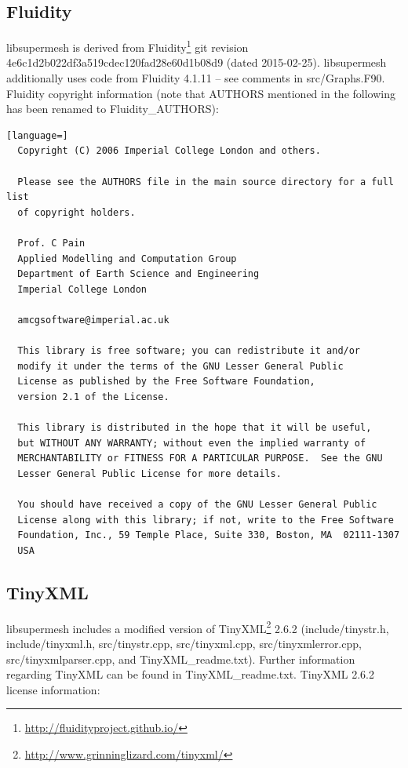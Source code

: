 \documentclass{article}
\begin{document}
\subsection{Fluidity}

libsupermesh is derived from
Fluidity\footnote{\url{http://fluidityproject.github.io/}} git revision
4e6c1d2b022df3a519cdec120fad28e60d1b08d9 (dated 2015-02-25). libsupermesh
additionally uses code from Fluidity 4.1.11 -- see comments in src/Graphs.F90.
Fluidity copyright information (note that AUTHORS mentioned in the following has
been renamed to Fluidity\_AUTHORS):

\begin{lstlisting}[language=]
  Copyright (C) 2006 Imperial College London and others.
  
  Please see the AUTHORS file in the main source directory for a full list
  of copyright holders.

  Prof. C Pain
  Applied Modelling and Computation Group
  Department of Earth Science and Engineering
  Imperial College London

  amcgsoftware@imperial.ac.uk
  
  This library is free software; you can redistribute it and/or
  modify it under the terms of the GNU Lesser General Public
  License as published by the Free Software Foundation,
  version 2.1 of the License.

  This library is distributed in the hope that it will be useful,
  but WITHOUT ANY WARRANTY; without even the implied warranty of
  MERCHANTABILITY or FITNESS FOR A PARTICULAR PURPOSE.  See the GNU
  Lesser General Public License for more details.

  You should have received a copy of the GNU Lesser General Public
  License along with this library; if not, write to the Free Software
  Foundation, Inc., 59 Temple Place, Suite 330, Boston, MA  02111-1307
  USA
\end{lstlisting}

\subsection{TinyXML}

libsupermesh includes a modified version of
TinyXML\footnote{\url{http://www.grinninglizard.com/tinyxml/}} 2.6.2
(include/tinystr.h, include/tinyxml.h, \linebreak src/tinystr.cpp,
src/tinyxml.cpp, src/tinyxmlerror.cpp, src/tinyxmlparser.cpp, and
TinyXML\_readme.txt). Further information regarding TinyXML can be found in
TinyXML\_readme.txt. TinyXML 2.6.2 license information:
\end{document}
